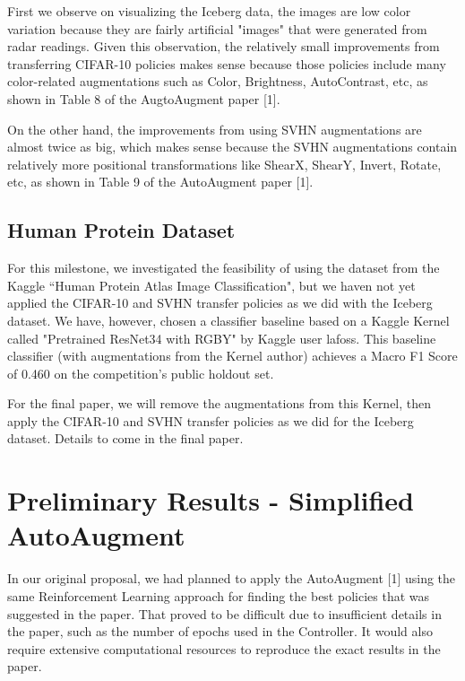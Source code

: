 \documentclass[10pt,twocolumn,letterpaper]{article}
\begin{document}
First we observe on visualizing the Iceberg data, the images are low color variation because they are fairly artificial "images" that were generated from radar readings. Given this observation, the relatively small improvements from transferring CIFAR-10 policies makes sense because those policies include many color-related augmentations such as Color, Brightness, AutoContrast, etc, as shown in Table 8 of the AugtoAugment paper [1].  

On the other hand, the improvements from using SVHN augmentations are almost twice as big, which makes sense because the SVHN augmentations contain relatively more positional transformations like ShearX, ShearY, Invert, Rotate, etc, as shown in Table 9 of the AutoAugment paper [1].  



\subsection{Human Protein Dataset}

For this milestone, we investigated the feasibility of using the dataset from the Kaggle “Human Protein Atlas Image Classification", but we haven not yet applied the CIFAR-10 and SVHN transfer policies as we did with the Iceberg dataset.  We have, however, chosen a classifier baseline based on a Kaggle Kernel called "Pretrained ResNet34 with RGBY" by Kaggle user lafoss.  This baseline classifier (with augmentations from the Kernel author) achieves a Macro F1 Score of 0.460 on the competition's public holdout set.  

For the final paper, we will remove the augmentations from this Kernel, then apply the CIFAR-10 and SVHN transfer policies as we did for the Iceberg dataset.  Details to come in the final paper.

\section{Preliminary Results - Simplified AutoAugment}

In our original proposal, we had planned to apply the AutoAugment [1] using the same Reinforcement Learning approach for finding the best policies that was suggested in the paper.  That proved to be difficult due to insufficient details in the paper, such as the number of epochs used in the Controller.  It would also require extensive computational resources to reproduce the exact results in the paper.
\end{document}
